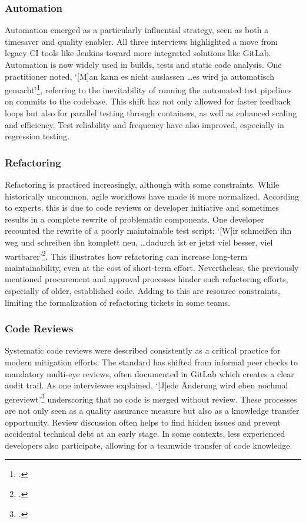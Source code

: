 \subsubsection{Automation}
Automation emerged as a particularly influential strategy, seen as both a timesaver and quality enabler. All three interviews highlighted a move from legacy CI tools like Jenkins toward more integrated solutions like GitLab. Automation is now widely used in builds, tests and static code analysis.
One practitioner noted, `[M]an kann es nicht auslassen \ldots es wird ja automatisch gemacht'\footcite[72]{Interview22025}, referring to the inevitability of running the automated test pipelines on commits to the codebase. This shift has not only allowed for faster feedback loops but also for parallel testing through
containers, as well as enhanced scaling and efficiency. Test reliability and frequency have also improved, especially in regression testing.

\subsubsection{Refactoring}
Refactoring is practiced increasingly, although with some constraints. While historically uncommon, agile workflows have made it more normalized. According to experts, this is due to code reviews or developer initiative and sometimes results in a complete rewrite of problematic components.
One developer recounted the rewrite of a poorly maintainable test script: `[W]ir schmeißen ihn weg und schreiben ihn komplett neu, \ldots dadurch ist er jetzt viel besser, viel wartbarer'\footcite[75]{Interview22025}. This illustrates how refactoring can increase long-term maintainability, even at the cost of short-term effort.
Nevertheless, the previously mentioned procurement and approval processes hinder such refactoring efforts, especially of older, established code. Adding to this are resource constraints, limiting the formalization of refactoring tickets in some teams.

\subsubsection{Code Reviews}
Systematic code reviews were described consistently as a critical practice for modern mitigation efforts. The standard has shifted from informal peer checks to mandatory multi-eye reviews, often documented in GitLab which creates a clear audit trail. As one interviewee explained, `[J]ede Änderung wird eben nochmal gereviewt'\footcite[73]{Interview22025}
underscoring that no code is merged without review. These processes are not only seen as a quality assurance measure but also as a knowledge transfer opportunity. Review discussion often helps to find hidden issues and prevent accidental technical debt at an early stage. In some contexts,
less experienced developers also participate, allowing for a teamwide transfer of code knowledge.


